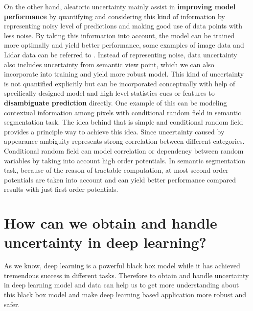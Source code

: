 On the other hand, aleatoric uncertainty mainly assist in \textbf{improving model performance} by quantifying and considering this kind of information by representing noisy level of predictions and making good use of data points with less noise. By taking this information into account, the model can be trained more optimally and yield better performance, some examples of image data and Lidar data can be referred to \cite{kendall2016modelling}\cite{feng2018towards}. Instead of representing noise, data uncertainty also includes uncertainty from semantic view point, which we can also incorporate into training and yield more robust model. This kind of uncertainty is not quantified explicitly but can be incorporated conceptually with help of specifically designed model and high level statistics cues or features to \textbf{disambiguate prediction} directly. One example of this can be modeling contextual information among pixels with conditional random field in semantic segmentation task\cite{krahenbuhl2011efficient}\cite{sutton2012introduction}\cite{lin2016efficient}. The idea behind that is simple and conditional random field provides a principle way to achieve this idea. Since uncertainty caused by appearance ambiguity represents strong correlation between different categories. Conditional random field can model correlation or dependency between random variables by taking into account high order potentials. In semantic segmentation task, because of the reason of tractable computation, at most second order potentials are taken into account and can yield better performance compared results with just first order potentials.

\section{How can we obtain and handle uncertainty in deep learning?}
As we know, deep learning is a powerful black box model while it has achieved tremendous success in different tasks. Therefore to obtain and handle uncertainty in deep learning model and data can help us to get more understanding about this black box model and make deep learning based application more robust and safer. 

